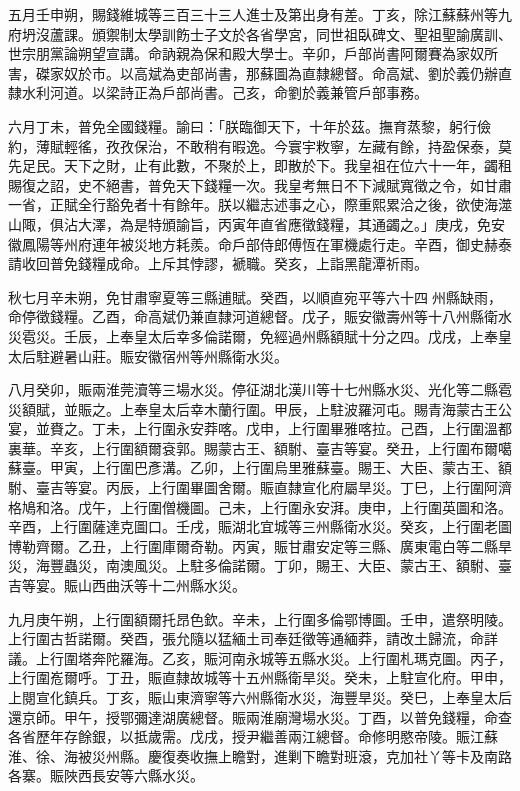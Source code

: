 \begin{pinyinscope}
五月壬申朔，賜錢維城等三百三十三人進士及第出身有差。丁亥，除江蘇蘇州等九府坍沒蘆課。頒禦制太學訓飭士子文於各省學宮，同世祖臥碑文、聖祖聖諭廣訓、世宗朋黨論朔望宣講。命訥親為保和殿大學士。辛卯，戶部尚書阿爾賽為家奴所害，磔家奴於市。以高斌為吏部尚書，那蘇圖為直隸總督。命高斌、劉於義仍辦直隸水利河道。以梁詩正為戶部尚書。己亥，命劉於義兼管戶部事務。

六月丁未，普免全國錢糧。諭曰：「朕臨御天下，十年於茲。撫育蒸黎，躬行儉約，薄賦輕徭，孜孜保治，不敢稍有暇逸。今寰宇敉寧，左藏有餘，持盈保泰，莫先足民。天下之財，止有此數，不聚於上，即散於下。我皇祖在位六十一年，蠲租賜復之詔，史不絕書，普免天下錢糧一次。我皇考無日不下減賦寬徵之令，如甘肅一省，正賦全行豁免者十有餘年。朕以繼志述事之心，際重熙累洽之後，欲使海澨山陬，俱沾大澤，為是特頒諭旨，丙寅年直省應徵錢糧，其通蠲之。」庚戌，免安徽鳳陽等州府連年被災地方耗羨。命戶部侍郎傅恆在軍機處行走。辛酉，御史赫泰請收回普免錢糧成命。上斥其悖謬，褫職。癸亥，上詣黑龍潭祈雨。

秋七月辛未朔，免甘肅寧夏等三縣逋賦。癸酉，以順直宛平等六十四州縣缺雨，命停徵錢糧。乙酉，命高斌仍兼直隸河道總督。戊子，賑安徽壽州等十八州縣衛水災雹災。壬辰，上奉皇太后幸多倫諾爾，免經過州縣額賦十分之四。戊戌，上奉皇太后駐避暑山莊。賑安徽宿州等州縣衛水災。

八月癸卯，賑兩淮莞瀆等三場水災。停征湖北漢川等十七州縣水災、光化等二縣雹災額賦，並賑之。上奉皇太后幸木蘭行圍。甲辰，上駐波羅河屯。賜青海蒙古王公宴，並賚之。丁未，上行圍永安莽喀。戊申，上行圍畢雅喀拉。己酉，上行圍溫都裏華。辛亥，上行圍額爾袞郭。賜蒙古王、額駙、臺吉等宴。癸丑，上行圍布爾噶蘇臺。甲寅，上行圍巴彥溝。乙卯，上行圍烏里雅蘇臺。賜王、大臣、蒙古王、額駙、臺吉等宴。丙辰，上行圍畢圖舍爾。賑直隸宣化府屬旱災。丁巳，上行圍阿濟格鳩和洛。戊午，上行圍僧機圖。己未，上行圍永安湃。庚申，上行圍英圖和洛。辛酉，上行圍薩達克圖口。壬戌，賑湖北宜城等三州縣衛水災。癸亥，上行圍老圖博勒齊爾。乙丑，上行圍庫爾奇勒。丙寅，賑甘肅安定等三縣、廣東電白等二縣旱災，海豐蟲災，南澳風災。上駐多倫諾爾。丁卯，賜王、大臣、蒙古王、額駙、臺吉等宴。賑山西曲沃等十二州縣水災。

九月庚午朔，上行圍額爾托昂色欽。辛未，上行圍多倫鄂博圖。壬申，遣祭明陵。上行圍古哲諾爾。癸酉，張允隨以猛緬土司奉廷徵等通緬莽，請改土歸流，命詳議。上行圍塔奔陀羅海。乙亥，賑河南永城等五縣水災。上行圍札瑪克圖。丙子，上行圍峞爾呼。丁丑，賑直隸故城等十五州縣衛旱災。癸未，上駐宣化府。甲申，上閱宣化鎮兵。丁亥，賑山東濟寧等六州縣衛水災，海豐旱災。癸巳，上奉皇太后還京師。甲午，授鄂彌達湖廣總督。賑兩淮廟灣場水災。丁酉，以普免錢糧，命查各省歷年存餘銀，以抵歲需。戊戌，授尹繼善兩江總督。命修明愍帝陵。賑江蘇淮、徐、海被災州縣。慶復奏收撫上瞻對，進剿下瞻對班滾，克加社丫等卡及南路各寨。賑陜西長安等六縣水災。


\end{pinyinscope}
